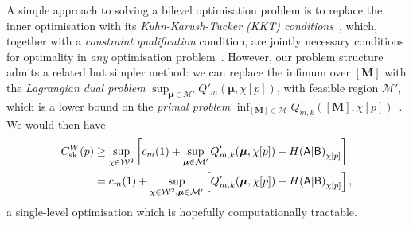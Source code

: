 \documentclass[10pt, a4paper]{article}
\numberwithin{equation}{section} %
\theoremstyle{definition}
\theoremstyle{plain}
\newcommand{\?}{\mathrel{?}} %
\newcommand{\cvec}[1]{\boldsymbol{\mathbf{#1}}}    %
\newcommand{\matr}[2][]{\left[\mathbf{#2}#1\right]} %
\newcommand{\sM}{\mathcal{M}}
\newcommand{\sW}{\mathcal{W}}
\newcommand{\crv}[1]{\mathsf{#1}}
\newcommand{\sk}{\rm sk}
\begin{document}
                  A simple approach to solving a bilevel optimisation problem is to replace the inner optimisation with its \emph{Kuhn-Karush-Tucker (KKT) conditions}~\cite{BilevelReview}, which, together with a \emph{constraint qualification} condition, are jointly necessary conditions for optimality in \emph{any} optimisation problem~\cite[Ch. 11.5]{LuenbergerYe}. However, our problem structure admits a related but simpler method: we can replace the infimum over \(\matr{M}\) with the \emph{Lagrangian dual problem} \(\sup_{\cvec{\mu} \in \sM'} Q'_m(\cvec{\mu}, \chi[p])\), with feasible region \(\sM'\), which is a lower bound on the \emph{primal problem} \(\inf_{\matr{M} \in \sM} Q_{m,k}(\matr{M}, \chi[p])\)~\cite[Ch. 5.9.1]{BoydVand}. We would then have
                  \begin{align}
                    C^W_{\sk}(p) &\geq \sup_{\chi\in\sW^2} \left[ c_m(1) + \sup_{\cvec{\mu} \in \sM'} Q_{m,k}'(\cvec{\mu}, \chi[p]) - H{(\crv{A}|\crv{B})}_{\chi[p]} \right] \\
                                 &= c_m(1) + \sup_{\chi\in\sW^2, \cvec{\mu} \in \sM'} \left[ Q_{m,k}'(\cvec{\mu}, \chi[p]) - H{(\crv{A}|\crv{B})}_{\chi[p]} \right],\label{eqn:wircap_dual}
                  \end{align}
                  a single-level optimisation which is hopefully computationally tractable.
\end{document}
